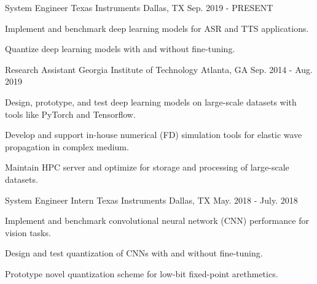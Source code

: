 

\begin{cventries}

\cventry
{System Engineer} %
{Texas Instruments} %
{Dallas, TX} %
{Sep. 2019 - PRESENT} %
{
    \begin{cvitems} %
        \item {Implement and benchmark deep learning models for ASR and TTS applications.}
        \item {Quantize deep learning models with and without fine-tuning.}
    \end{cvitems}
}

  \cventry
    {Research Assistant} %
    {Georgia Institute of Technology} %
    {Atlanta, GA} %
    {Sep. 2014 - Aug. 2019} %
    {
      \begin{cvitems} %
        \item {Design, prototype, and test deep learning models on large-scale datasets with tools like PyTorch and Tensorflow.}
        \item {Develop and support in-house numerical (FD) simulation tools for elastic wave propagation in complex medium.}
        \item {Maintain HPC server and optimize for storage and processing of large-scale datasets.}
      \end{cvitems}
    }

\cventry
{System Engineer Intern} %
{Texas Instruments} %
{Dallas, TX} %
{May. 2018 - July. 2018} %
{
    \begin{cvitems} %
        \item {Implement and benchmark convolutional neural network (CNN) performance for vision tasks.}
        \item {Design and test quantization of CNNs with and without fine-tuning.}
        \item {Prototype novel quantization scheme for low-bit fixed-point arethmetics.}
    \end{cvitems}
}


\end{cventries}
